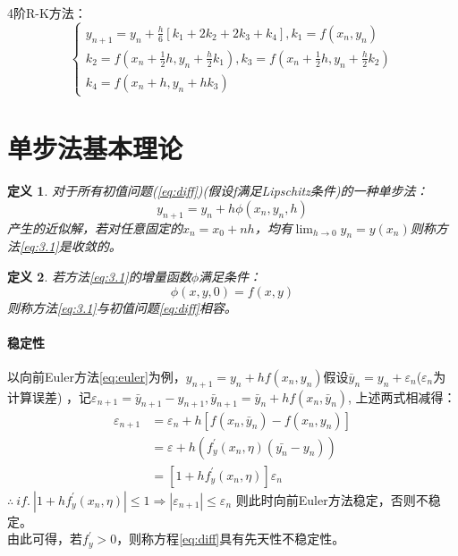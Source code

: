 \documentclass{article}
\newtheorem{definition}{定义}[section]
\begin{document}
4阶R-K方法：
\begin{equation}
    \left\{
    \begin{array}{lr}
        y_{n+1} = y_n +\frac{h}{6}[k_1+2k_2+2k_3+k_4], k_1=f(x_n, y_n) \\
        k_2 = f(x_n+\frac{1}{2}h, y_n+\frac{h}{2}k_1), k_3=f(x_n+\frac{1}{2}h, y_n+\frac{h}{2}k_2) \\
        k_4 = f(x_n+h, y_n+hk_3)
    \end{array}\right.
\end{equation}

\section{单步法基本理论}
\begin{definition}
    对于所有初值问题(\ref{eq:diff})(假设f满足Lipschitz条件)的一种单步法：
    \begin{equation}
        y_{n+1}=y_n+h\phi(x_n,y_n,h)
        \label{eq:3.1}
    \end{equation}
    产生的近似解，若对任意固定的$x_n=x_0+nh$，均有$\lim_{h\rightarrow 0}y_n=y(x_n) $则称方法\ref{eq:3.1}是收敛的。
\end{definition}

\begin{definition}
    若方法\ref{eq:3.1}的增量函数$\phi$满足条件：
    \begin{equation*}
        \phi(x,y,0)=f(x,y)
    \end{equation*}
    则称方法\ref{eq:3.1}与初值问题\ref{eq:diff}相容。
\end{definition}

\paragraph{稳定性}
以向前Euler方法\ref{eq:euler}为例，$y_{n+1}=y_n+hf(x_n,y_n) $假设$\bar{y}_n=y_n+\varepsilon_n$($\varepsilon_n$为计算误差)
，记$\varepsilon_{n+1}=\bar{y}_{n+1}-y_{n+1} , \bar{y}_{n+1}=\bar{y}_n+hf(x_n, \bar{y}_n) $,
上述两式相减得：
\begin{equation*}
    \begin{split}
        \varepsilon_{n+1} &= \varepsilon_n +h[f(x_n, \bar{y}_n)-f(x_n,y_n)] \\
        &= \varepsilon + h(f^{'}_y(x_n, \eta)(\bar{y_n}-y_n)) \\
        &=[1+hf^{'}_y(x_n, \eta)]\varepsilon_n
    \end{split}
\end{equation*}
$\therefore \ if. \ |1+hf^{'}_y(x_n, \eta)|\le 1 \Rightarrow |\varepsilon_{n+1} |\le \varepsilon_n$
则此时向前Euler方法稳定，否则不稳定。\\
由此可得，若$f^{'}_y>0 $，则称方程\ref{eq:diff}具有先天性不稳定性。
\end{document}
